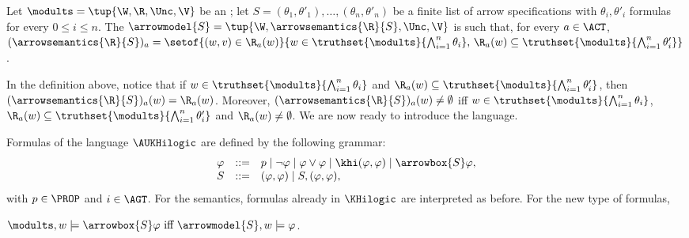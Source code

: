 \medskip 

\begin{definition}
Let $\modults = \tup{\W, \R, \Unc, \V}$ be an \ults; let $S = (\theta_1,\theta'_1),\dots,(\theta_n,\theta'_n)$ be a finite list of arrow specifications with $\theta_i,\theta'_i$ formulas for every $0\leq i \leq n$. The \ults $\arrowmodel{S} = \tup{\W, \arrowsemantics{\R}{S}, \Unc,\V}$ is such that, for every $a\in\ACT$,
	$(\arrowsemantics{\R}{S})_a = \setof{(w,v) \in \R_a(w)}{w \in \truthset{\modults}{\bigwedge_{i=1}^n \theta_i} \text{, } \R_a(w) \subseteq \truthset{\modults}{\bigwedge_{i=1}^n \theta'_i}}$.
\end{definition}

\medskip

In the definition above, notice that if $w \in \truthset{\modults}{\bigwedge_{i=1}^n \theta_i}$ and $\R_a(w) \subseteq \truthset{\modults}{\bigwedge_{i=1}^n \theta'_i}$, then $(\arrowsemantics{\R}{S})_a(w) = \R_a(w)$. Moreover, $(\arrowsemantics{\R}{S})_a(w) \neq \emptyset$ iff $w \in \truthset{\modults}{\bigwedge_{i=1}^n \theta_i}$, $\R_a(w) \subseteq \truthset{\modults}{\bigwedge_{i=1}^n \theta'_i}$ and $\R_a(w) \neq \emptyset$.
We are now ready to introduce the language.

\medskip

\begin{definition}\label{def:arrowsyntax}\label{def:arrowupdate}
Formulas of the language $\AUKHilogic$ are defined by the following grammar:
\[
\begin{array}{lcl}
\varphi & ::= & p \mid \neg\varphi \mid \varphi\vee\varphi \mid
\khi(\varphi,\varphi) \mid \arrowbox{S}\varphi, \\
S & ::= & (\varphi,\varphi) \mid S,(\varphi,\varphi),
\end{array}
\]
with $p \in \PROP$ and $i\in\AGT$. 
For the semantics, formulas already in $\KHilogic$ are interpreted as before. For the new type of formulas, 
\begin{spcenter}
	$\modults,w \models \arrowbox{S}\varphi \mbox{ iff } \arrowmodel{S},w \models \varphi$.
\end{spcenter}
\end{definition}

